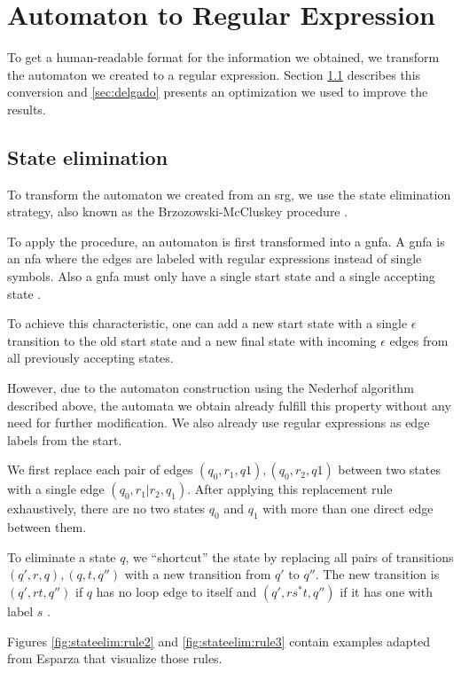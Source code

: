 \section{Automaton to Regular Expression}\label{sec:nfa2regex}

To get a human-readable format for the information we obtained, we transform the automaton we created to a regular expression. Section \ref{sec:stateElimination} describes this conversion and \ref{sec:delgado} presents an optimization we used to improve the results.

\subsection{State elimination}\label{sec:stateElimination}

To transform the automaton we created from an \ac{srg}, we use the state elimination strategy, also known as the Brzozowski-McCluskey procedure \cite{brzozowksi_mccluskey}.

To apply the procedure, an automaton is first transformed into a \ac{gnfa}. A \ac{gnfa} is an \ac{nfa} where the edges are labeled with regular expressions instead of single symbols.
Also a \ac{gnfa} must only have a single start state and a single accepting state \cite{hanGNFA}.

To achieve this characteristic, one can add a new start state with a single $\epsilon$ transition to the old start state and a new final state with incoming $\epsilon$ edges from all previously accepting states.

However, due to the automaton construction using the Nederhof algorithm described above, the automata we obtain already fulfill this property without any need for further modification.
We also already use regular expressions as edge labels from the start.

We first replace each pair of edges $(q_0, r_1, q1), (q_0, r_2, q1)$ between two states with a single edge $(q_0, r_1|r_2, q_1)$.
After applying this replacement rule exhaustively, there are no two states $q_0$ and $q_1$ with more than one direct edge between them.

To eliminate a state $q$, we \enquote{shortcut} the state by replacing all pairs of transitions $(q',r, q), (q, t, q'')$ with a new transition from $q'$ to $q''$.
The new transition is $(q', rt, q'')$ if $q$ has no loop edge to itself and $(q', rs^*t, q'')$ if it has one with label $s$ \cite{esparza}.

Figures \ref{fig:stateelim:rule2} and \ref{fig:stateelim:rule3} contain examples adapted from Esparza \cite{esparza} that visualize those rules.


